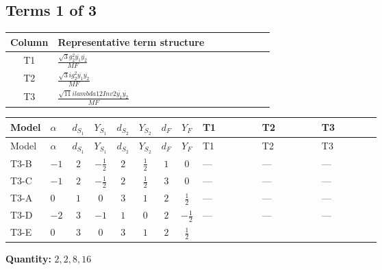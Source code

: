 \documentclass[8pt]{article}
\begin{document}
\begin{landscape}
\subsection*{Terms 1 of 3}
\begin{center}
\begin{tabular}{@{}c >{\raggedright\arraybackslash}p{0.82\linewidth}@{}}
\toprule
Column & Representative term structure \\
\midrule
T1 & \(\displaystyle \frac{\sqrt{3} g_{2}^{2} \overline{y_{1}} \overline{y_{2}}}{MF}\) \\
\midrule
T2 & \(\displaystyle \frac{\sqrt{3} i g_{2}^{2} \overline{y_{1}} \overline{y_{2}}}{MF}\) \\
\midrule
T3 & \(\displaystyle \frac{\sqrt{11} i lambda12Inv2 \overline{y_{1}} \overline{y_{2}}}{MF}\) \\
\midrule
\bottomrule
\end{tabular}
\end{center}
\smallskip
\tiny
\begin{longtable}{@{}llcccccc >{\raggedright\arraybackslash}p{0.21\linewidth} >{\raggedright\arraybackslash}p{0.21\linewidth} >{\raggedright\arraybackslash}p{0.21\linewidth}@{}}
\toprule
Model & $\alpha$ & $d_{S_1}$ & $Y_{S_1}$ & $d_{S_2}$ & $Y_{S_2}$ & $d_F$ & $Y_F$ & T1 & T2 & T3 \\
\midrule
\endfirsthead
\toprule
Model & $\alpha$ & $d_{S_1}$ & $Y_{S_1}$ & $d_{S_2}$ & $Y_{S_2}$ & $d_F$ & $Y_F$ & T1 & T2 & T3 \\
\midrule
\endhead
T3-B & $-1$ & $2$ & $-\frac{1}{2}$ & $2$ & $\frac{1}{2}$ & $1$ & $0$ & --- & --- & --- \\
\midrule
T3-C & $-1$ & $2$ & $-\frac{1}{2}$ & $2$ & $\frac{1}{2}$ & $3$ & $0$ & --- & --- & --- \\
\midrule
T3-A & $0$ & $1$ & $0$ & $3$ & $1$ & $2$ & $\frac{1}{2}$ & --- & --- & --- \\
\midrule
T3-D & $-2$ & $3$ & $-1$ & $1$ & $0$ & $2$ & $-\frac{1}{2}$ & --- & --- & --- \\
\midrule
T3-E & $0$ & $3$ & $0$ & $3$ & $1$ & $2$ & $\frac{1}{2}$ & \scriptsize\adjustbox{max width=\linewidth}{$\begin{gathered} \frac{\sqrt{3} g_{2}^{2} \overline{y_{1}} \overline{y_{2}}}{6 MF}\end{gathered}$} & \scriptsize\adjustbox{max width=\linewidth}{$\begin{gathered} - \frac{49 \sqrt{3} i g_{2}^{2} \overline{y_{1}} \overline{y_{2}}}{24 MF}\end{gathered}$} & \scriptsize\adjustbox{max width=\linewidth}{$\begin{gathered} - \frac{3 \sqrt{11} i lambda12Inv2 \overline{y_{1}} \overline{y_{2}}}{22 MF}\end{gathered}$} \\
\midrule
\bottomrule
\end{longtable}
\clearpage
\noindent\textbf{Quantity: }$\mathrm{2,2,8,16}$\par\smallskip

\end{landscape}
\end{document}
